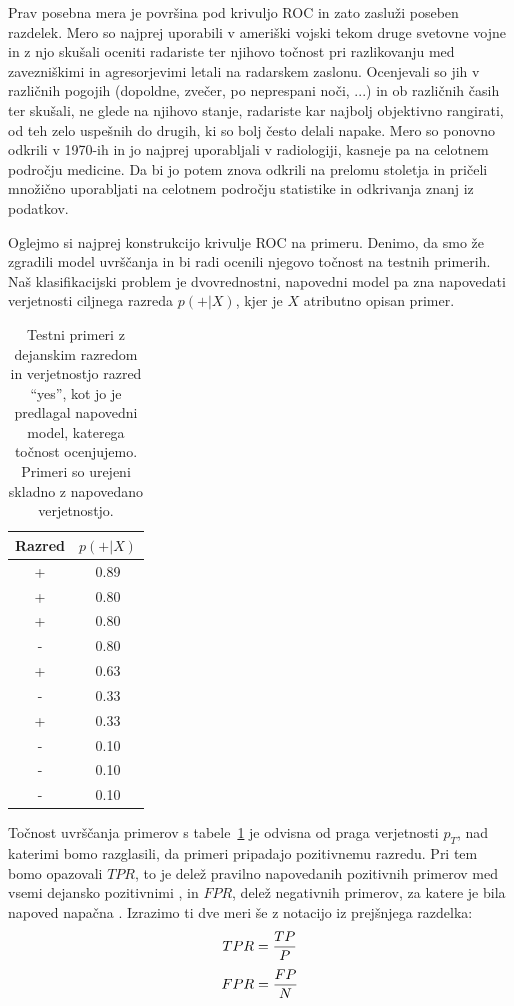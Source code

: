 Prav posebna mera je površina pod krivuljo ROC  in zato zasluži poseben razdelek. Mero so najprej uporabili v ameriški vojski tekom druge svetovne vojne in z njo skušali oceniti radariste ter njihovo točnost pri razlikovanju med zavezniškimi in agresorjevimi letali na radarskem zaslonu. Ocenjevali so jih v različnih pogojih (dopoldne, zvečer, po neprespani noči, ...) in ob različnih časih ter skušali, ne glede na njihovo stanje, radariste kar najbolj objektivno rangirati, od teh zelo uspešnih do drugih, ki so bolj često delali napake. Mero so ponovno odkrili v 1970-ih in jo najprej uporabljali v radiologiji, kasneje pa na celotnem področju medicine. Da bi jo potem znova odkrili na prelomu stoletja in pričeli množično uporabljati na celotnem področju statistike in odkrivanja znanj iz podatkov.

Oglejmo si najprej konstrukcijo krivulje ROC na primeru. Denimo, da smo že zgradili model uvrščanja in bi radi ocenili njegovo točnost na testnih primerih. Naš klasifikacijski problem je dvovrednostni, napovedni model pa zna napovedati verjetnosti ciljnega razreda $p(+|X)$, kjer je $X$ atributno opisan primer.

\begin{table}[htbp]
\caption{Testni primeri z dejanskim razredom in verjetnostjo razred ``yes'', kot jo je predlagal napovedni model, katerega točnost ocenjujemo. Primeri so urejeni skladno z napovedano verjetnostjo.}
\label{t-auc}
\begin{center}
\begin{tabular}{cc}
\toprule
Razred & $p(+|X)$ \\
\midrule
+ & 0.89 \\
+ & 0.80 \\
+ & 0.80 \\
- & 0.80 \\
+ & 0.63 \\
- & 0.33 \\
+ & 0.33 \\
- & 0.10 \\
- & 0.10 \\
- & 0.10 \\
\bottomrule
\end{tabular}
\end{center}
\end{table}

Točnost uvrščanja primerov s tabele~\ref{t-auc} je odvisna od praga verjetnosti $p_T$, nad katerimi bomo razglasili, da primeri pripadajo pozitivnemu razredu. Pri tem bomo opazovali $TPR$, to je delež pravilno napovedanih pozitivnih primerov med vsemi dejansko pozitivnimi , in $FPR$, delež negativnih primerov, za katere je bila napoved napačna . Izrazimo ti dve meri še z notacijo iz prejšnjega razdelka:
$$ TPR = {TP \over P} $$
$$ FPR = {FP \over N} $$

